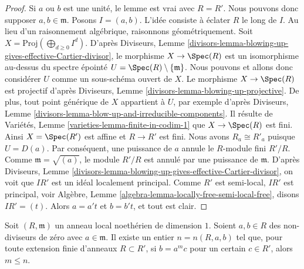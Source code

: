 \begin{proof}
Si $a$ ou $b$ est une unité, le lemme est vrai avec $R = R'$.
Nous pouvons donc supposer $a, b \in \mathfrak m$.
Posons $I = (a, b)$. L'idée consiste à éclater $R$ le long de $I$.
Au lieu d'un raisonnement algébrique, raisonnons géométriquement.
Soit $X = \text{Proj}(\bigoplus_{d \geq 0} I^d)$.
D'après Diviseurs, Lemme
\ref{divisors-lemma-blowing-up-gives-effective-Cartier-divisor},
le morphisme $X \to \Spec(R)$ est un isomorphisme au-dessus du
spectre épointé $U = \Spec(R) \setminus \{\mathfrak m\}$.
Nous pouvons et allons donc considérer $U$ comme un sous-schéma ouvert de $X$.
Le morphisme $X \to \Spec(R)$ est projectif d'après
Diviseurs, Lemme \ref{divisors-lemma-blowing-up-projective}.
De plus, tout point générique de $X$ appartient à $U$, par exemple
d'après Diviseurs, Lemme \ref{divisors-lemma-blow-up-and-irreducible-components}.
Il résulte de Variétés, Lemme \ref{varieties-lemma-finite-in-codim-1}
que $X \to \Spec(R)$ est fini. Ainsi $X = \Spec(R')$ est
affine et $R \to R'$ est fini. Nous avons $R_a \cong R'_a$ puisque $U = D(a)$.
Par conséquent, une puissance de $a$ annule le $R$-module fini $R'/R$.
Comme $\mathfrak m = \sqrt{(a)}$, le module $R'/R$ est annulé
par une puissance de $\mathfrak m$. D'après
Diviseurs, Lemme \ref{divisors-lemma-blowing-up-gives-effective-Cartier-divisor},
on voit que $IR'$ est un idéal localement principal.
Comme $R'$ est semi-local, $IR'$ est principal,
voir Algèbre, Lemme \ref{algebra-lemma-locally-free-semi-local-free},
disons $IR' = (t)$. Alors $a = a't$ et $b = b't$, et tout est
clair.
\end{proof}

\begin{lemma}
\label{lemma-not-infinitely-divisible}
Soit $(R, \mathfrak m)$ un anneau local noethérien de dimension $1$.
Soient $a, b \in R$ des non-diviseurs de zéro avec $a \in \mathfrak m$.
Il existe un entier $n = n(R, a, b)$ tel que, pour toute extension finie
d'anneaux $R \subset R'$, si $b = a^m c$ pour un certain $c \in R'$, alors $m \leq n$.
\end{lemma}

